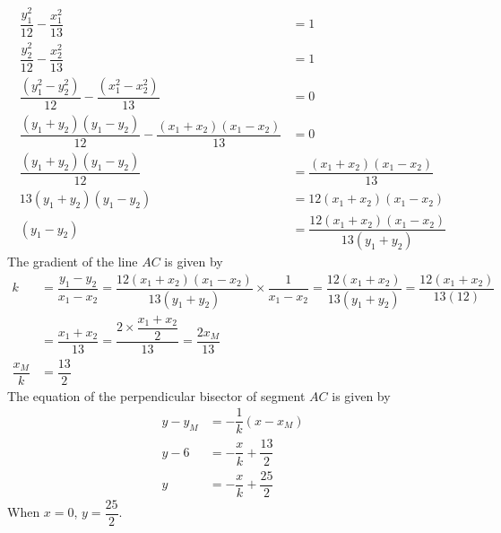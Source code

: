 \documentclass{report}
\begin{document}
\begin{enumerate}
\begin{enumerate}
                    \begin{align*}
                        \dfrac{y_1^2}{12} - \dfrac{x_1^2}{13}                                   & = 1                                               \\
                        \dfrac{y_2^2}{12} - \dfrac{x_2^2}{13}                                   & = 1                                               \\
                        \dfrac{(y_1^2 - y_2^2)}{12} - \dfrac{(x_1^2 - x_2^2)}{13}               & = 0                                               \\
                        \dfrac{(y_1 + y_2)(y_1 - y_2)}{12} - \dfrac{(x_1 + x_2)(x_1 - x_2)}{13} & = 0                                               \\
                        \dfrac{(y_1 + y_2)(y_1 - y_2)}{12}                                      & =  \dfrac{(x_1 + x_2)(x_1 - x_2)}{13}             \\
                        13(y_1 + y_2)(y_1 - y_2)                                                & = 12(x_1 + x_2)(x_1 - x_2)                        \\
                        (y_1 - y_2)                                                             & = \dfrac{12(x_1 + x_2)(x_1 - x_2)}{13(y_1 + y_2)}
                    \end{align*}
                    The gradient of the line $AC$ is given by
                    \begin{align*}
                        k              & = \dfrac{y_1 - y_2}{x_1 - x_2} = \dfrac{12(x_1 + x_2)(x_1 - x_2)}{13(y_1 + y_2)} \times \dfrac{1}{x_1 - x_2} = \dfrac{12(x_1 + x_2)}{13(y_1 + y_2)} = \dfrac{12(x_1 + x_2)}{13(12)} \\
                                       & = \dfrac{x_1 + x_2}{13} = \dfrac{2\times\dfrac{x_1 + x_2}{2}}{13} = \dfrac{2x_M}{13}                                                                                                \\
                        \dfrac{x_M}{k} & = \dfrac{13}{2}
                    \end{align*}
                    The equation of the perpendicular bisector of segment $AC$ is given by
                    \begin{align*}
                        y - y_M & = -\dfrac{1}{k}(x - x_M)        \\
                        y - 6   & = -\dfrac{x}{k} + \dfrac{13}{2} \\
                        y       & = -\dfrac{x}{k} + \dfrac{25}{2}
                    \end{align*}
                    When $x = 0$, $y = \dfrac{25}{2}$.


\end{enumerate}
\end{enumerate}
\end{document}
